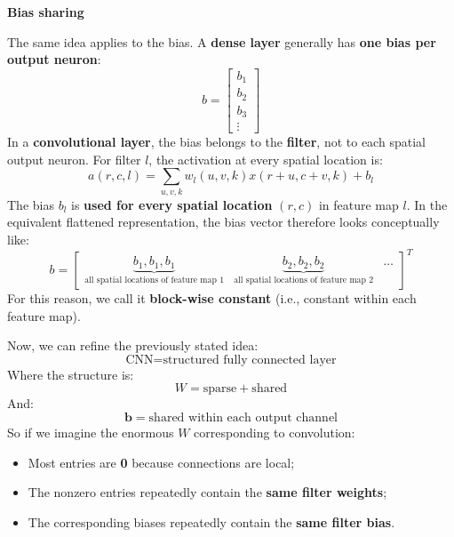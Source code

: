 \highspace
\begin{flushleft}
    \textcolor{Green3}{ \textbf{Bias sharing}}
\end{flushleft}
The same idea applies to the bias. A \textbf{dense layer} generally has \textbf{one bias per output neuron}:
\begin{equation*}
    b=
    \begin{bmatrix}
    b_1 \\ b_2 \\ b_3 \\ \vdots
    \end{bmatrix}
\end{equation*}
In a \textbf{convolutional layer}, the bias belongs to the \textbf{filter}, not to each spatial output neuron. For filter $l$, the activation at every spatial location is:
\begin{equation*}
    a(r, c, l) = \sum_{u, v, k} w_l (u, v, k) x(r + u, c + v, k) + b_l
\end{equation*}
The bias $b_l$ is \textbf{used for every spatial location} $(r, c)$ in feature map $l$. In the equivalent flattened representation, the bias vector therefore looks conceptually like:
\begin{equation*}
    b = \begin{bmatrix}
        \underbrace{b_1, b_1, b_1}_{\text{all spatial locations of feature map 1}} & \underbrace{b_2, b_2, b_2}_{\text{all spatial locations of feature map 2}} & \ldots
    \end{bmatrix}^T
\end{equation*}
For this reason, we call it \textbf{block-wise constant} (i.e., constant within each feature map).

\highspace
Now, we can refine the previously stated idea:
\begin{equation*}
    \text{CNN} = \text{structured fully connected layer}
\end{equation*}
Where the structure is:
\begin{equation*}
    W = \text{sparse} + \text{shared}
\end{equation*}
And:
\begin{equation*}
    \mathbf{b} = \text{shared within each output channel}
\end{equation*}
So if we imagine the enormous $W$ corresponding to convolution:
\begin{itemize}
    \item Most entries are \textbf{0} because connections are local;
    \item The nonzero entries repeatedly contain the \textbf{same filter weights};
    \item The corresponding biases repeatedly contain the \textbf{same filter bias}.
\end{itemize}


